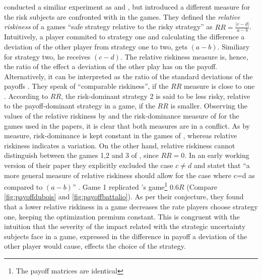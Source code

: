 \textcite{dubois_optimization_2012} conducted a similiar experiment as 
\textcite{schmidt_playing_2003} and \textcite{battalio_optimization_2001},
but introduced a different measure for the risk subjects are confronted with in
the games. They defined the \textit{relative riskiness} of a games 
``safe strategy relative to the risky strategy'' as $RR = \frac{|c-d|}{a-b}$. 
Intuitively, a player commited to strategy one and calculating the 
difference a deviation of the other player from strategy one to two, gets
$(a-b)$. Similiary for strategy two, he receives $(c-d)$. The relative riskiness
measure is, hence, the ratio of the effect a deviation of the other play has 
on the payoff. Alternatively, it can be interpreted as the ratio of the 
standard deviations of the payoffs 
\parencite[372]{dubois_optimization_2012}. 
They speak of ``comparable riskiness'', if the $RR$ measure is close to one 
\parencite[372]{dubois_optimization_2012}. 
According to $RR$, the risk-dominant 
strategy 2 is said to be less risky, relative to the 
payoff-dominant strategy in a game, if the $RR$ is smaller.
Observing the values of the relative riskiness by 
\textcite{dubois_optimization_2012} and the risk-dominance measure of 
\textcite{schmidt_playing_2003} for the games used in the papers, it is clear
that both measures are in a conflict. As by \textcite{schmidt_playing_2003}
measure, risk-dominance is kept constant in the games of 
\textcite{battalio_optimization_2001}, whereas relative riskiness indicates a
variation. On the other hand, relative riskiness cannot distinguish between
the games 1,2 and 3 of \textcite{schmidt_playing_2003}, since $RR=0$. In an
early working version of their paper they explicitly excluded the case 
$c \neq d$ and statet that ``a more general measure of relative riskiness 
should allow for the case where c=d as compared to $(a-b)$'' 
\parencite{dubois_optimization_2008}. 
Game 1 replicated \textcite{battalio_optimization_2001}'s 
game\footnote{The payoff matrices are identical} $0.6R$ (Compare \ref{fig:payoffdubois} and \ref{fig:payoffbattalio}). 
As per their conjecture, they found that a lower relative riskiness 
in a game decreases the rate players choose strategy one, 
keeping the optimization premium constant. This is congruent with 
the intuition that the severity of the impact related with the 
strategic uncertainty subjects face in a game, expressed in
the difference in payoff a deviation of the other player would cause,
effects the choice of the strategy. 
